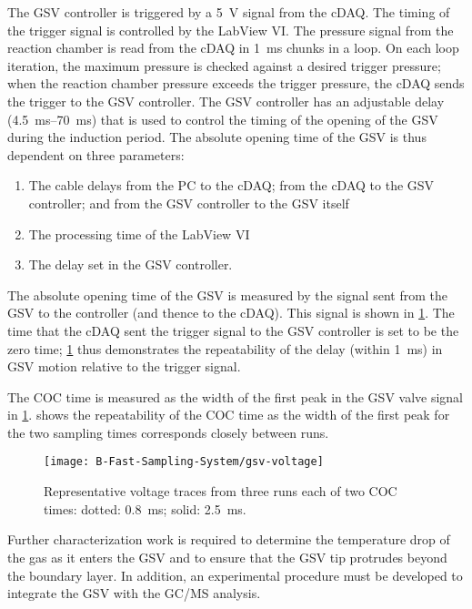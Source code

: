 \documentclass[../main.tex]{subfiles}
\begin{document}
The GSV controller is triggered by a \SI{5}{\volt} signal from the cDAQ.
The timing of the trigger signal is controlled by the LabView VI. The pressure
signal from the reaction chamber is read from the cDAQ in \SI{1}{\milli\second}
chunks in a loop. On each loop iteration, the maximum pressure is checked
against a desired trigger pressure; when the reaction chamber pressure exceeds
the trigger pressure, the cDAQ sends the trigger to the GSV controller. The
GSV controller has an adjustable delay (\SIrange{4.5}{70}{\milli\second}) that
is used to control the timing of the opening of the GSV during the induction period.
The absolute opening time of the GSV is thus dependent on three parameters:
\begin{enumerate}
\item The cable delays from the PC to the cDAQ; from the cDAQ to the GSV
      controller; and from the GSV controller to the GSV itself
\item The processing time of the LabView VI
\item The delay set in the GSV controller.
\end{enumerate}

The absolute opening time of the GSV is measured by
the signal sent from the GSV to the controller (and thence to the cDAQ).
This signal is shown in \cref{fig:gsv-voltage}. The time that
the cDAQ sent the trigger signal to the GSV controller is set to be the
zero time; \cref{fig:gsv-voltage} thus demonstrates the
repeatability of the delay (within \SI{1}{\milli\second}) in
GSV motion relative to the trigger signal.

The COC time is measured as the width of the first peak in the
GSV valve signal in \cref{fig:gsv-voltage}. 
shows the repeatability of the COC time as the width of the first
peak for the two sampling times corresponds closely between runs.

\begin{figure}
\texttt{[image: B-Fast-Sampling-System/gsv-voltage]}
\caption{Representative voltage traces from three runs each of two
COC times: dotted: \SI{0.8}{\milli\second}; solid: \SI{2.5}{\milli\second}.}
\label{fig:gsv-voltage}
\end{figure}

Further characterization work is required to determine the temperature
drop of the gas as it enters the GSV and to ensure that the GSV tip
protrudes beyond the boundary layer. In addition, an experimental
procedure must be developed to integrate the GSV with the GC/MS analysis.
\end{document}
